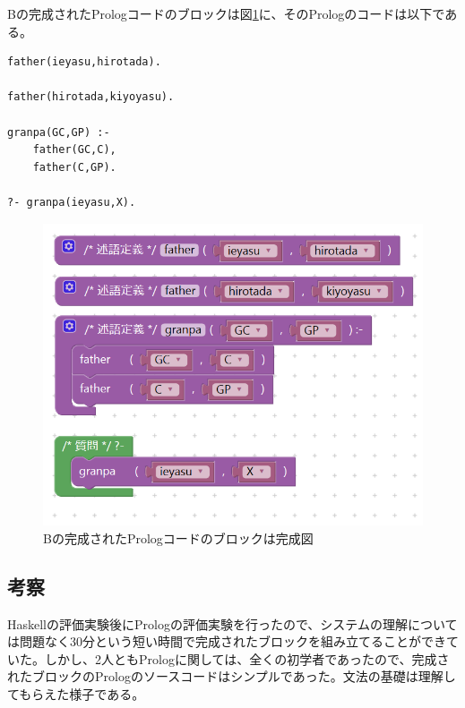\documentclass{risepaper}
\begin{document}
\begin{itemize}
Bの完成されたPrologコードのブロックは図\ref{fig:prolog_experiment_result_b}に、そのPrologのコードは以下である。
\begin{lstlisting}[basicstyle=\ttfamily\footnotesize]
father(ieyasu,hirotada).

father(hirotada,kiyoyasu).

granpa(GC,GP) :-
    father(GC,C),
    father(C,GP).

?- granpa(ieyasu,X).
\end{lstlisting}

\begin{figure}[h]
\begin{center}
\includegraphics[scale=0.5]{img/prolog_experiment_result_b.PNG}
\caption{Bの完成されたPrologコードのブロックは完成図}%
\label{fig:prolog_experiment_result_b}
\end{center}%
\end{figure}%

\end{itemize} 
        
		\subsection{考察}
        
Haskellの評価実験後にPrologの評価実験を行ったので、システムの理解については問題なく30分という短い時間で完成されたブロックを組み立てることができていた。しかし、2人ともPrologに関しては、全くの初学者であったので、完成されたブロックのPrologのソースコードはシンプルであった。文法の基礎は理解してもらえた様子である。
\end{document}

